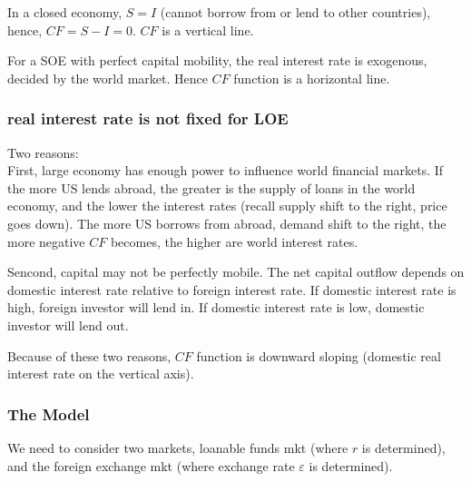 \documentclass[12pt]{article}
\begin{document}
In a closed economy, $ S = I $ (cannot borrow from or lend to other countries), hence,
$ CF = S - I = 0 $. $ CF $ is a vertical line.

For a SOE with perfect capital mobility, the real interest rate is exogenous, 
decided by the world market. Hence $ CF $ function is a horizontal line.

\begin{figure}[H]
\end{figure}



\subsubsection{real interest rate is not fixed for LOE}
Two reasons:\\
First, large economy has enough power to influence world financial markets.
If the more US lends abroad, the greater is the supply of loans in the world economy,
and the lower the interest rates (recall supply shift to the right, price goes down).
The more US borrows from abroad, demand shift to the right, the more negative $ CF $
becomes, the higher are world interest rates.


Sencond, capital may not be perfectly mobile. The net capital outflow depends on 
domestic interest rate relative to foreign interest rate. 
If domestic interest rate is high, foreign investor will lend in. If domestic
interest rate is low, domestic investor will lend out.


Because of these two reasons, $ CF $ function is downward sloping (domestic real
interest rate on the vertical axis).



\subsubsection{The Model}
We need to consider two markets, loanable funds mkt (where $ r $ is determined), and
the foreign exchange mkt (where exchange rate $ \varepsilon $ is determined).
\end{document}
